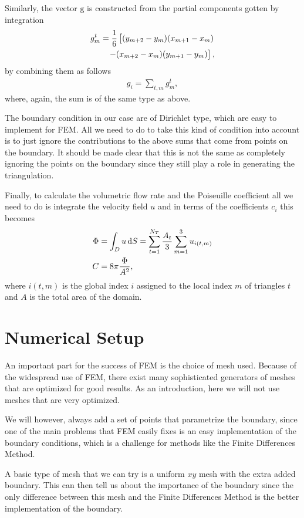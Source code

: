 \documentclass[10pt,a4paper,twocolumn]{article}
\renewcommand{\vec}[1]{\bm{\mathrm{#1}}}
\begin{document}
Similarly, the vector $\vec{g}$ is constructed from the partial components gotten by integration
%
\begin{align}
    g^{t}_{m} = \frac{1}{6}\left[ (y_{m+2} - y_{m})(x_{m+1} - x_{m}) \right. \notag\\ \left. - (x_{m+2} - x_{m})(y_{m+1} - y_{m}) \right],
\end{align}
%
by combining them as follows
%
\begin{align}
    g_{i} = \sum_{t, m} g^{t}_{m},
\end{align}
%
where, again, the sum is of the same type as above.

The boundary condition in our case are of Dirichlet type, which are easy to implement for FEM. All we need to do to take this kind of condition into account is to just ignore the contributions to the above sums that come from points on the boundary. \cite{BCs} It should be made clear that this is not the same as completely ignoring the points on the boundary since they still play a role in generating the triangulation.

Finally, to calculate the volumetric flow rate and the Poiseuille coefficient all we need to do is integrate the velocity field $u$ and in terms of the coefficients $c_i$ this becomes
%
\begin{align}
    \Phi &= \int_{D} u \dif S = \sum_{t=1}^{N_T} \frac{A_t}{3} \sum_{m=1}^{3} u_{i(t, m)}\\
    C &= 8 \pi \frac{\Phi}{A^2},
\end{align}
%
where $i(t, m)$ is the global index $i$ assigned to the local index $m$ of triangles $t$ and $A$ is the total area of the domain.

\section{Numerical Setup}

An important part for the success of FEM is the choice of mesh used. Because of the widespread use of FEM, there exist many sophisticated generators of meshes that are optimized for good results. As an introduction, here we will not use meshes that are very optimized.

We will however, always add a set of points that parametrize the boundary, since one of the main problems that FEM easily fixes is an easy implementation of the boundary conditions, which is a challenge for methods like the Finite Differences Method.

A basic type of mesh that we can try is a uniform $xy$ mesh with the extra added boundary. This can then tell us about the importance of the boundary since the only difference between this mesh and the Finite Differences Method is the better implementation of the boundary.
\end{document}
